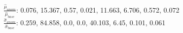 $\frac{\hat\mu_{anom}}{\hat\mu_{base}}$: 0.076, 15.367, 0.57, 0.021, 11.663, 6.706, 0.572, 0.072\\$\frac{\hat\sigma_{anom}}{\hat\sigma_{base}}$: 0.259, 84.858, 0.0, 0.0, 40.103, 6.45, 0.101, 0.061